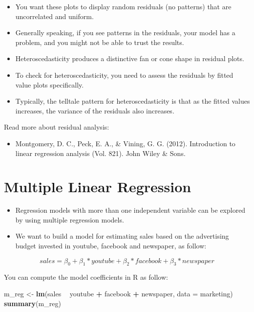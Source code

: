 \documentclass[]{book}
\newenvironment{Shaded}{\begin{snugshade}}{\end{snugshade}}
\newcommand{\DataTypeTok}[1]{\textcolor[rgb]{0.13,0.29,0.53}{#1}}
\newcommand{\KeywordTok}[1]{\textcolor[rgb]{0.13,0.29,0.53}{\textbf{#1}}}
\newcommand{\NormalTok}[1]{#1}
\newcommand{\OperatorTok}[1]{\textcolor[rgb]{0.81,0.36,0.00}{\textbf{#1}}}
\newcommand{\StringTok}[1]{\textcolor[rgb]{0.31,0.60,0.02}{#1}}
\providecommand{\tightlist}{%
  \setlength{\itemsep}{0pt}\setlength{\parskip}{0pt}}
\begin{document}
\begin{itemize}
\item
  You want these plots to display random residuals (no patterns) that are uncorrelated and uniform.
\item
  Generally speaking, if you see patterns in the residuals, your model has a problem, and you might not be able to trust the results.
\item
  Heteroscedasticity produces a distinctive fan or cone shape in residual plots.
\item
  To check for heteroscedasticity, you need to assess the residuals by fitted value plots specifically.
\item
  Typically, the telltale pattern for heteroscedasticity is that as the fitted values increases, the variance of the residuals also increases.
\end{itemize}

Read more about residual analysis:

\begin{itemize}
\tightlist
\item
  Montgomery, D. C., Peck, E. A., \& Vining, G. G. (2012). Introduction to linear regression analysis (Vol. 821). John Wiley \& Sons.
\end{itemize}

\hypertarget{multiple-linear-regression}{%
\section{Multiple Linear Regression}\label{multiple-linear-regression}}

\begin{itemize}
\item
  Regression models with more than one independent variable can be explored by using multiple regression models.
\item
  We want to build a model for estimating sales based on the advertising budget invested in youtube, facebook and newspaper, as follow:
\end{itemize}

\[sales = \beta_0 + \beta_1*youtube + \beta_2*facebook + \beta_3*newspaper\]

You can compute the model coefficients in R as follow:

\begin{Shaded}
\begin{Highlighting}[]
\NormalTok{m_reg <-}\StringTok{ }\KeywordTok{lm}\NormalTok{(sales }\OperatorTok{~}\StringTok{ }\NormalTok{youtube }\OperatorTok{+}\StringTok{ }\NormalTok{facebook }\OperatorTok{+}\StringTok{ }\NormalTok{newspaper, }\DataTypeTok{data =}\NormalTok{ marketing)}
\KeywordTok{summary}\NormalTok{(m_reg)}
\end{Highlighting}
\end{Shaded}
\end{document}
